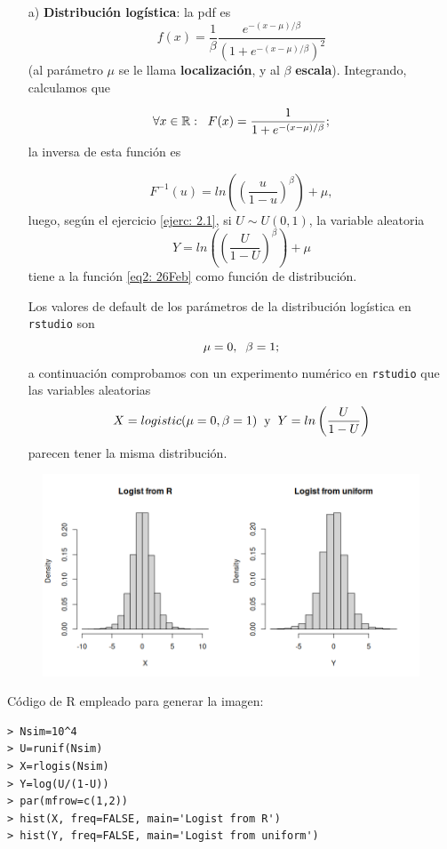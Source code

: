\begin{itemize}
\item[a)] \textbf{Distribución logística}: la pdf es
\begin{equation}
\label{eq2: 26Feb}
f(x)= \frac{1}{\beta} \frac{e^{-(x- \mu)/ \beta}}{(1+e^{-(x- \mu)/ \beta})^{2}}
\end{equation}
(al parámetro $\mu$ se le llama \textbf{localización}, y al $\beta$
\textbf{escala}). Integrando, calculamos que

\[
\forall x \in \mathbb{R} : \hspace{0.2cm}
F(x)= \frac{1}{1+e^{-(x-\mu)/\beta}};
\]
la inversa de esta función es 

\[
F^{-1}(u)= ln \left( \left( \frac{u}{1-u}  \right)^{\beta} \right) + \mu,
\]
luego, según el ejercicio \ref{ejerc: 2.1}, si $U \sim U(0,1)$, la variable
aleatoria
\[
Y = ln \left( \left( \frac{U}{1-U}  \right)^{\beta} \right) + \mu
\]
tiene a la función \eqref{eq2: 26Feb} como función de distribución.

Los valores de default de los parámetros de la distribución logística
en \texttt{rstudio} son 
\[
\mu=0, \hspace{0.2cm} \beta=1;
\]
a continuación comprobamos con un experimento numérico
en \texttt{rstudio} que las variables aleatorias
\begin{equation}
\label{eq3: 26Feb}
X = logistic(\mu=0, \beta=1) \hspace{0.2cm} \text{y}
\hspace{0.2cm} Y= ln \left( \frac{U}{1-U} \right)
\end{equation}
parecen tener la misma distribución.
\end{itemize}

\begin{figure}[H]
\centering
	\includegraphics[scale=0.5]{logistic} 
\end{figure}
Código de R empleado para generar la imagen:
\begin{verbatim}
> Nsim=10^4
> U=runif(Nsim)
> X=rlogis(Nsim)
> Y=log(U/(1-U))
> par(mfrow=c(1,2))
> hist(X, freq=FALSE, main='Logist from R')
> hist(Y, freq=FALSE, main='Logist from uniform')
\end{verbatim}


